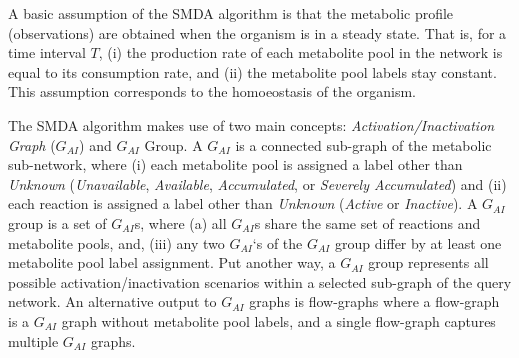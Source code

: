 A basic assumption of the SMDA algorithm is that the metabolic profile
(observations) are obtained when the organism is in a steady state. That is, for
a time interval $T$, (i) the production rate of each metabolite pool in the
network is equal to its consumption rate, and (ii) the metabolite pool labels
stay constant. This assumption corresponds to the homoeostasis of the organism.

The SMDA algorithm makes use of two main concepts: \emph{Activation/Inactivation
Graph} ($G_{AI}$) and $G_{AI}$ Group. A $G_{AI}$ is a connected sub-graph of the
metabolic sub-network, where (i) each metabolite pool is assigned a label other
than \emph{Unknown} (\emph{Unavailable}, \emph{Available}, \emph{Accumulated},
or \emph{Severely Accumulated}) and (ii) each reaction is assigned a label other
than \emph{Unknown} (\emph{Active} or \emph{Inactive}). A $G_{AI}$ group is a set
of $G_{AI}$s, where (a) all $G_{AI}$s share the same set of reactions and metabolite
pools, and, (iii) any two $G_{AI}$‘s of the $G_{AI}$ group differ by at least one
metabolite pool label assignment.  Put another way, a $G_{AI}$ group represents all
possible activation/inactivation scenarios within a selected sub-graph of the
query network. An alternative output to $G_{AI}$ graphs is flow-graphs where a
flow-graph is a $G_{AI}$ graph without metabolite pool labels, and a single
flow-graph captures multiple $G_{AI}$ graphs.
